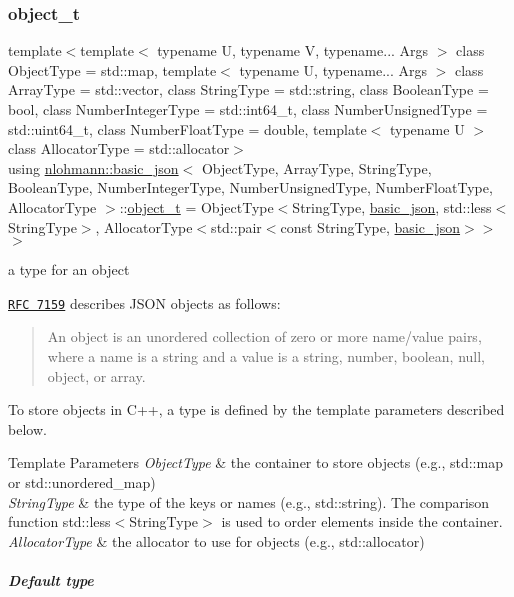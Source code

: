 \subsubsection{\texorpdfstring{object\+\_\+t}{object\_t}}
{\footnotesize\ttfamily template$<$template$<$ typename U, typename V, typename... Args $>$ class Object\+Type = std\+::map, template$<$ typename U, typename... Args $>$ class Array\+Type = std\+::vector, class String\+Type  = std\+::string, class Boolean\+Type  = bool, class Number\+Integer\+Type  = std\+::int64\+\_\+t, class Number\+Unsigned\+Type  = std\+::uint64\+\_\+t, class Number\+Float\+Type  = double, template$<$ typename U $>$ class Allocator\+Type = std\+::allocator$>$ \\
using \hyperlink{classnlohmann_1_1basic__json}{nlohmann\+::basic\+\_\+json}$<$ Object\+Type, Array\+Type, String\+Type, Boolean\+Type, Number\+Integer\+Type, Number\+Unsigned\+Type, Number\+Float\+Type, Allocator\+Type $>$\+::\hyperlink{classnlohmann_1_1basic__json_a0ac9894c9de8dc551cf2e5f1c605537f}{object\+\_\+t} =  Object\+Type$<$String\+Type, \hyperlink{classnlohmann_1_1basic__json}{basic\+\_\+json}, std\+::less$<$String\+Type$>$, Allocator\+Type$<$std\+::pair$<$const String\+Type, \hyperlink{classnlohmann_1_1basic__json}{basic\+\_\+json}$>$$>$$>$}



a type for an object 

\href{http://rfc7159.net/rfc7159}{\tt R\+FC 7159} describes J\+S\+ON objects as follows\+: \begin{quote}
An object is an unordered collection of zero or more name/value pairs, where a name is a string and a value is a string, number, boolean, null, object, or array. \end{quote}


To store objects in C++, a type is defined by the template parameters described below.


\begin{DoxyTemplParams}{Template Parameters}
{\em Object\+Type} & the container to store objects (e.\+g., {\ttfamily std\+::map} or {\ttfamily std\+::unordered\+\_\+map}) \\
\hline
{\em String\+Type} & the type of the keys or names (e.\+g., {\ttfamily std\+::string}). The comparison function {\ttfamily std\+::less$<$String\+Type$>$} is used to order elements inside the container. \\
\hline
{\em Allocator\+Type} & the allocator to use for objects (e.\+g., {\ttfamily std\+::allocator})\\
\hline
\end{DoxyTemplParams}
\subparagraph*{Default type}

